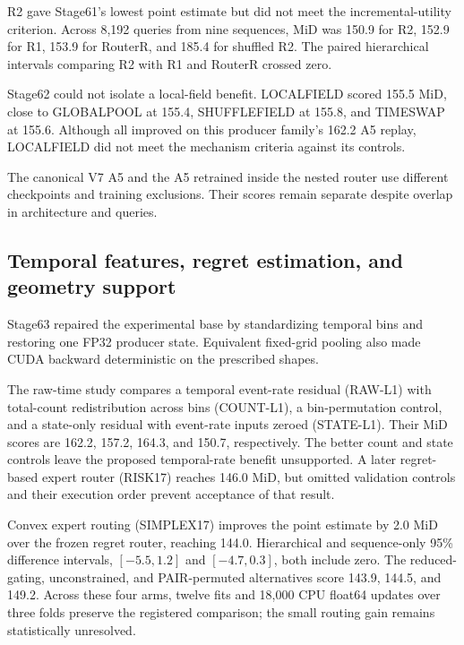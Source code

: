 

R2 gave Stage61's lowest point estimate but did not meet the incremental-utility criterion. Across 8,192 queries from nine sequences, MiD was 150.9 for R2, 152.9 for R1, 153.9 for RouterR, and 185.4 for shuffled R2. The paired hierarchical intervals comparing R2 with R1 and RouterR crossed zero.

Stage62 could not isolate a local-field benefit. LOCALFIELD scored 155.5 MiD, close to GLOBALPOOL at 155.4, SHUFFLEFIELD at 155.8, and TIMESWAP at 155.6. Although all improved on this producer family's 162.2 A5 replay, LOCALFIELD did not meet the mechanism criteria against its controls.

The canonical V7 A5 and the A5 retrained inside the nested router use different checkpoints and training exclusions. Their scores remain separate despite overlap in architecture and queries. 

\subsection{Temporal features, regret estimation, and geometry support}

Stage63 repaired the experimental base by standardizing temporal bins and restoring one FP32 producer state. Equivalent fixed-grid pooling also made CUDA backward deterministic on the prescribed shapes.

The raw-time study compares a temporal event-rate residual (RAW-L1) with total-count redistribution across bins (COUNT-L1), a bin-permutation control, and a state-only residual with event-rate inputs zeroed (STATE-L1). Their MiD scores are 162.2, 157.2, 164.3, and 150.7, respectively. The better count and state controls leave the proposed temporal-rate benefit unsupported. A later regret-based expert router (RISK17) reaches 146.0 MiD, but omitted validation controls and their execution order prevent acceptance of that result.

Convex expert routing (SIMPLEX17) improves the point estimate by 2.0 MiD over the frozen regret router, reaching 144.0. Hierarchical and sequence-only 95\% difference intervals, $[-5.5,1.2]$ and $[-4.7,0.3]$, both include zero. The reduced-gating, unconstrained, and PAIR-permuted alternatives score 143.9, 144.5, and 149.2. Across these four arms, twelve fits and 18,000 CPU float64 updates over three folds preserve the registered comparison; the small routing gain remains statistically unresolved.

